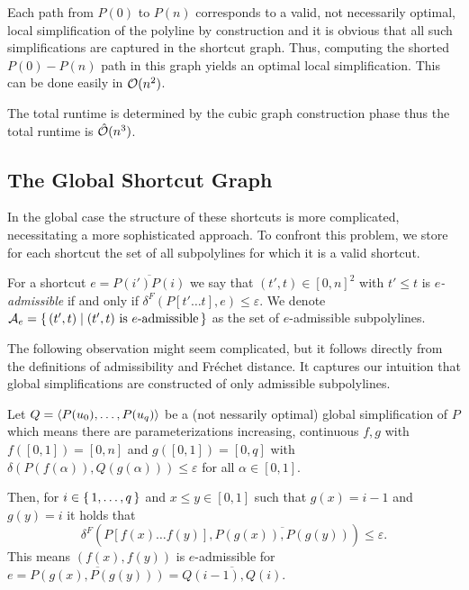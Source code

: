 Each path from \(P(0)\) to \(P(n)\) corresponds to a valid, not necessarily optimal, local simplification of the polyline by construction and it is obvious that all such simplifications are captured in the shortcut graph. Thus, computing the shorted \(P(0)-P(n)\) path in this graph yields an optimal local simplification. This can be done easily in \(\mathcal{O}(n^2)\).

The total runtime is determined by the cubic graph construction phase thus the total runtime is \(\hat{\mathcal{O}}(n^3)\).

\subsection{The Global Shortcut Graph}
In the global case the structure of these shortcuts is more complicated, necessitating a more sophisticated approach. To confront this problem, we store for each shortcut the set of all subpolylines for which it is a valid shortcut. 

\begin{definition}
  For a shortcut \(e = \overline{P(i')P(i)}\) we say that \((t', t) \in [0, n]^2\) with \(t' \leq t\) is \emph{\(e\)-admissible} if and only if \(\delta^F(P[t' \dots t], e) \leq \varepsilon\). We denote \(\mathcal{A}_e = \set{(t', t) \mid (t', t) \textrm{ is } e\textrm{-admissible}}\) as the set of \(e\)-admissible subpolylines.
\end{definition}

The following observation might seem complicated, but it follows directly from the definitions of admissibility and Fréchet distance. It captures our intuition that global simplifications are constructed of only admissible subpolylines.

\begin{observation}
	Let \(Q=\left\langle P(u_0), \dots, P(u_q)\right\rangle\) be a (not nessarily optimal) global simplification of \(P\) which means there are parameterizations increasing, continuous \(f, g\) with \(f([0, 1]) = [0, n]\) and \(g([0,1]) = [0, q]\) with \(\delta(P(f(\alpha)), Q(g(\alpha))) \leq \varepsilon\) for all \(\alpha \in [0, 1]\).

	Then, for \(i \in \set{1, \dots, q}\) and \(x \leq y \in [0, 1]\) such that \(g(x) = i - 1\) and \(g(y) = i\) it holds that 
	\[\delta^F(P[f(x) \dots f(y)], \overline{P(g(x)), P(g(y))}) \leq \varepsilon.\]
	This means \((f(x), f(y))\) is \(e\)-admissible for \(e = \overline{P(g(x), P(g(y)))} = \overline{Q(i-1), Q(i)}\).
\end{observation}

